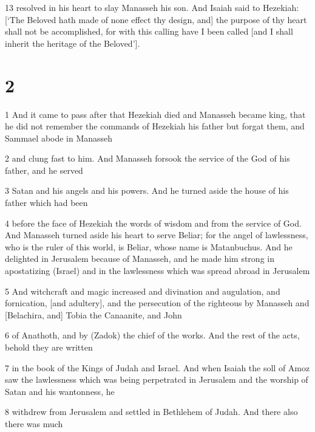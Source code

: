\par 13 resolved in his heart to slay Manasseh his son. And Isaiah said to Hezekiah: [‘The Beloved hath made of none effect thy design, and] the purpose of thy heart shall not be accomplished, for with this calling have I been called [and I shall inherit the heritage of the Beloved’].

\chapter{2}

\par 1 And it came to pass after that Hezekiah died and Manasseh became king, that he did not remember the commands of Hezekiah his father but forgat them, and Sammael abode in Manasseh

\par 2 and clung fast to him. And Manasseh forsook the service of the God of his father, and he served

\par 3 Satan and his angels and his powers. And he turned aside the house of his father which had been

\par 4 before the face of Hezekiah the words of wisdom and from the service of God. And Manasseh turned aside his heart to serve Beliar; for the angel of lawlessness, who is the ruler of this world, is Beliar, whose name is Matanbuchus. And he delighted in Jerusalem because of Manasseh, and he made him strong in apostatizing (Israel) and in the lawlessness which was spread abroad in Jerusalem

\par 5 And witchcraft and magic increased and divination and augulation, and fornication, [and adultery], and the persecution of the righteous by Manasseh and [Belachira, and] Tobia the Canaanite, and John

\par 6 of Anathoth, and by (Zadok) the chief of the works. And the rest of the acts, behold they are written

\par 7 in the book of the Kings of Judah and Israel. And when Isaiah the soll of Amoz saw the lawlessness which was being perpetratcd in Jerusalem and the worship of Satan and his wantonness, he

\par 8 withdrew from Jerusalem and settled in Bethlehem of Judah. And there also there was much

